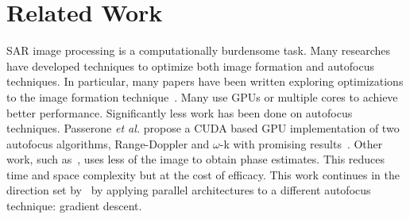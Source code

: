 \section{Related Work}\label{sec:relatedwork}

SAR image processing is a computationally burdensome task. Many researches have
developed techniques to optimize both image formation and autofocus techniques.
In particular, many papers have been written exploring optimizations to the
image formation technique~\cite{yegulalp1999fast, hartley, liu, clemente, fasih, jin,
park2013efficient}. Many use GPUs or multiple cores to achieve better
performance. Significantly less work has been done on autofocus techniques.
Passerone \textit{et al.} propose a CUDA based GPU implementation of two
autofocus algorithms, Range-Doppler and $\omega$-k with promising
results~\cite{gpu-sar}. Other work, such as~\cite{less_mem_high_eff_autofocus},
uses less of the image to obtain phase estimates. This reduces time and space
complexity but at the cost of efficacy. This work continues in the direction set
by~\cite{gpu-sar} by applying parallel architectures to a different autofocus
technique: gradient descent.
